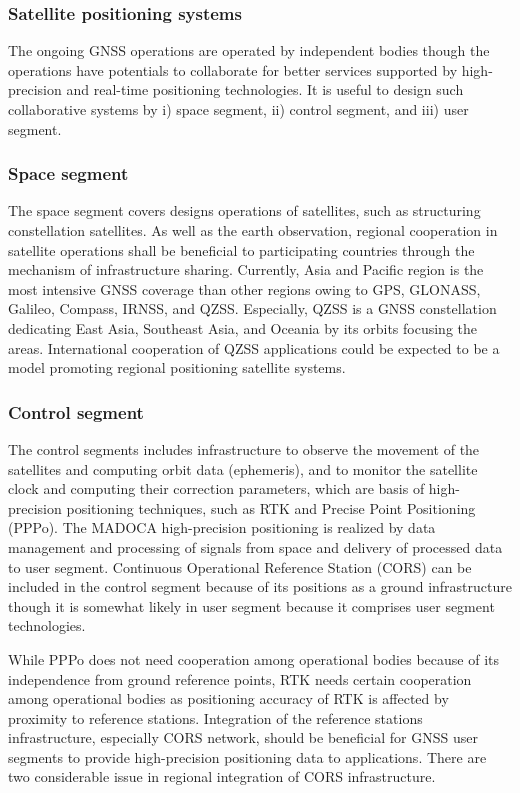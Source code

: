 \subsubsection{Satellite positioning systems}

The ongoing GNSS operations are operated by independent bodies though the operations have potentials to collaborate for better services supported by high-precision and real-time positioning technologies. It is useful to design such collaborative systems by i) space segment, ii) control segment, and iii) user segment.

\subsubsection*{Space segment}

The space segment covers designs operations of satellites, such as structuring constellation satellites. As well as the earth observation, regional cooperation in satellite operations shall be beneficial to participating countries through the mechanism of infrastructure sharing. Currently, Asia and Pacific region is the most intensive GNSS coverage than other regions owing to GPS, GLONASS, Galileo, Compass, IRNSS, and QZSS. Especially, QZSS is a GNSS constellation dedicating East Asia, Southeast Asia, and Oceania by its orbits focusing the areas. International cooperation of QZSS applications could be expected to be a model promoting regional positioning satellite systems.

\subsubsection*{Control segment}

The control segments includes infrastructure to observe the movement of the satellites and computing orbit data (ephemeris), and to monitor the satellite clock and computing their correction parameters, which are basis of high-precision positioning techniques, such as RTK and Precise Point Positioning (PPPo). The MADOCA high-precision positioning is realized by data management and processing of signals from space and delivery of processed data to user segment. Continuous Operational Reference Station (CORS) can be included in the control segment because of its positions as a ground infrastructure though it is somewhat likely in user segment because it comprises user segment technologies.

While PPPo does not need cooperation among operational bodies because of its independence from ground reference points, RTK needs certain cooperation among operational bodies as positioning accuracy of RTK is affected by proximity to reference stations. Integration of the reference stations infrastructure, especially CORS network, should be beneficial for GNSS user segments to provide high-precision positioning data to applications. There are two considerable issue in regional integration of CORS infrastructure.

